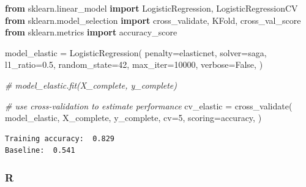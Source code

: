 \documentclass[
  letterpaper,
]{krantz}
\newenvironment{Shaded}{}{}
\newcommand{\CommentTok}[1]{\textcolor[rgb]{0.38,0.63,0.69}{\textit{#1}}}
\newcommand{\DecValTok}[1]{\textcolor[rgb]{0.25,0.63,0.44}{#1}}
\newcommand{\FloatTok}[1]{\textcolor[rgb]{0.25,0.63,0.44}{#1}}
\newcommand{\ImportTok}[1]{\textcolor[rgb]{0.00,0.50,0.00}{\textbf{#1}}}
\newcommand{\NormalTok}[1]{#1}
\newcommand{\OperatorTok}[1]{\textcolor[rgb]{0.40,0.40,0.40}{#1}}
\newcommand{\StringTok}[1]{\textcolor[rgb]{0.25,0.44,0.63}{#1}}
\newcommand{\VariableTok}[1]{\textcolor[rgb]{0.10,0.09,0.49}{#1}}
\begin{document}
\begin{Shaded}
\begin{Highlighting}[]
\ImportTok{from}\NormalTok{ sklearn.linear\_model }\ImportTok{import}\NormalTok{ LogisticRegression, LogisticRegressionCV}
\ImportTok{from}\NormalTok{ sklearn.model\_selection }\ImportTok{import}\NormalTok{ cross\_validate, KFold, cross\_val\_score}
\ImportTok{from}\NormalTok{ sklearn.metrics }\ImportTok{import}\NormalTok{ accuracy\_score}


\NormalTok{model\_elastic }\OperatorTok{=}\NormalTok{ LogisticRegression(}
\NormalTok{    penalty}\OperatorTok{=}\StringTok{\textquotesingle{}elasticnet\textquotesingle{}}\NormalTok{,}
\NormalTok{    solver}\OperatorTok{=}\StringTok{\textquotesingle{}saga\textquotesingle{}}\NormalTok{,}
\NormalTok{    l1\_ratio}\OperatorTok{=}\FloatTok{0.5}\NormalTok{,}
\NormalTok{    random\_state}\OperatorTok{=}\DecValTok{42}\NormalTok{,}
\NormalTok{    max\_iter}\OperatorTok{=}\DecValTok{10000}\NormalTok{,}
\NormalTok{    verbose}\OperatorTok{=}\VariableTok{False}\NormalTok{,}
\NormalTok{)}

\CommentTok{\# model\_elastic.fit(X\_complete, y\_complete)}

 \CommentTok{\# use cross{-}validation to estimate performance}
\NormalTok{cv\_elastic }\OperatorTok{=}\NormalTok{ cross\_validate(}
\NormalTok{    model\_elastic,}
\NormalTok{    X\_complete,}
\NormalTok{    y\_complete,}
\NormalTok{    cv}\OperatorTok{=}\DecValTok{5}\NormalTok{,}
\NormalTok{    scoring}\OperatorTok{=}\StringTok{\textquotesingle{}accuracy\textquotesingle{}}\NormalTok{,}
\NormalTok{)}
\end{Highlighting}
\end{Shaded}

\begin{verbatim}
Training accuracy:  0.829 
Baseline:  0.541
\end{verbatim}

\subsubsection{R}
\end{document}
